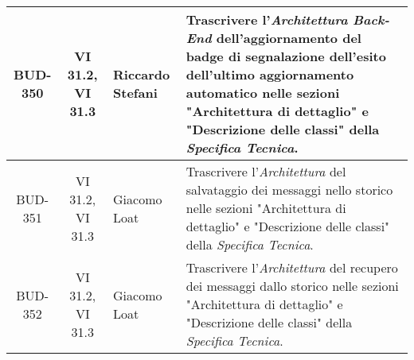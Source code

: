 \begin{table}[htbp]
\begin{tabular}{|c|c|p{}|p{}|}
    \hline
    BUD-350 & VI 31.2, VI 31.3 & Riccardo Stefani & Trascrivere l'\emph{Architettura} \emph{Back-End} dell’aggiornamento del badge di segnalazione dell’esito dell’ultimo aggiornamento automatico nelle sezioni "Architettura di dettaglio" e "Descrizione delle classi" della \emph{Specifica Tecnica}. \\
    \hline
    BUD-351 & VI 31.2, VI 31.3 & Giacomo Loat & Trascrivere l'\emph{Architettura} del salvataggio dei messaggi nello storico nelle sezioni "Architettura di dettaglio" e "Descrizione delle classi" della \emph{Specifica Tecnica}. \\
    \hline
    BUD-352 & VI 31.2, VI 31.3 & Giacomo Loat & Trascrivere l'\emph{Architettura} del recupero dei messaggi dallo storico nelle sezioni "Architettura di dettaglio" e "Descrizione delle classi" della \emph{Specifica Tecnica}. \\
    \hline
\end{tabular}
\end{table}

\newpage


